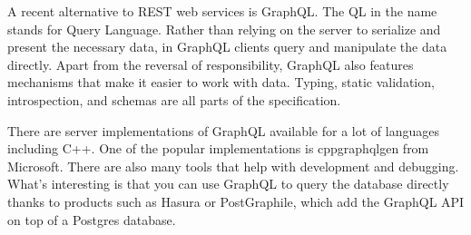 
A recent alternative to REST web services is GraphQL. The QL in the name stands for Query Language. Rather than relying on the server to serialize and present the necessary data, in GraphQL clients query and manipulate the data directly. Apart from the reversal of responsibility, GraphQL also features mechanisms that make it easier to work with data. Typing, static validation, introspection, and schemas are all parts of the specification.

There are server implementations of GraphQL available for a lot of languages including C++. One of the popular implementations is cppgraphqlgen from Microsoft. There are also many tools that help with development and debugging. What's interesting is that you can use GraphQL to query the database directly thanks to products such as Hasura or PostGraphile, which add the GraphQL API on top of a Postgres database.














